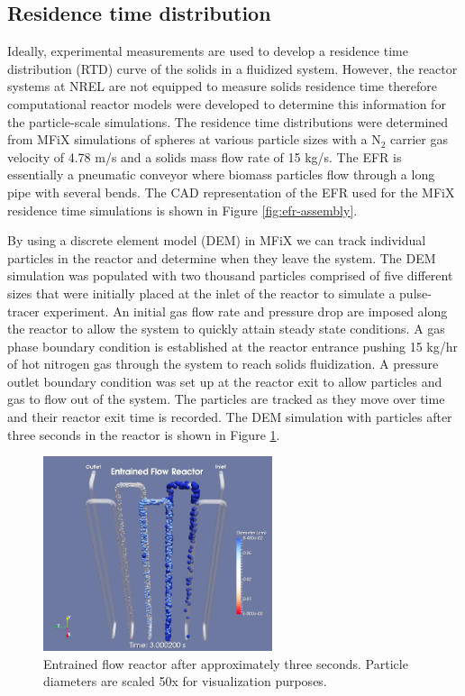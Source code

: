 \subsection{Residence time distribution}

Ideally, experimental measurements are used to develop a residence time distribution (RTD) curve of the solids in a fluidized system. However, the reactor systems at NREL are not equipped to measure solids residence time therefore computational reactor models were developed to determine this information for the particle-scale simulations. The residence time distributions were determined from MFiX simulations of spheres at various particle sizes with a {$\text{N}_2$} carrier gas velocity of 4.78 m/s and a solids mass flow rate of 15 kg/s. The EFR is essentially a pneumatic conveyor where biomass particles flow through a long pipe with several bends. The CAD representation of the EFR used for the MFiX residence time simulations is shown in Figure \ref{fig:efr-assembly}.

By using a discrete element model (DEM) in MFiX we can track individual particles in the reactor and determine when they leave the system. The DEM simulation was populated with two thousand particles comprised of five different sizes that were initially placed at the inlet of the reactor to simulate a pulse-tracer experiment. An initial gas flow rate and pressure drop are imposed along the reactor to allow the system to quickly attain steady state conditions. A gas phase boundary condition is established at the reactor entrance pushing 15 kg/hr of hot nitrogen gas through the system to reach solids fluidization. A pressure outlet boundary condition was set up at the reactor exit to allow particles and gas to flow out of the system. The particles are tracked as they move over time and their reactor exit time is recorded. The DEM simulation with particles after three seconds in the reactor is shown in Figure \ref{fig:mfix-particles}.

\begin{figure}[!ht]
	\centering
	\includegraphics[width=0.6\textwidth]{figures/mfix-particles.png}
	\caption{Entrained flow reactor after approximately three seconds. Particle diameters are scaled 50x for visualization purposes.}
	\label{fig:mfix-particles}
\end{figure}

